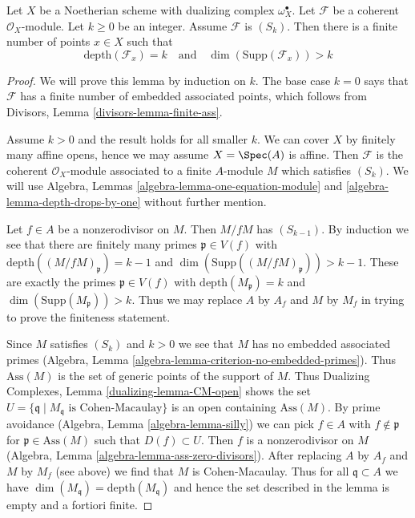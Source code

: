 \begin{lemma}
\label{lemma-finite-nr-points-next-S}
Let $X$ be a Noetherian scheme with dualizing complex $\omega_X^\bullet$.
Let $\mathcal{F}$ be a coherent $\mathcal{O}_X$-module. Let $k \geq 0$
be an integer. Assume $\mathcal{F}$ is $(S_k)$.
Then there is a finite number of points $x \in X$ such that
$$
\text{depth}(\mathcal{F}_x) = k
\quad\text{and}\quad
\dim(\text{Supp}(\mathcal{F}_x)) > k
$$
\end{lemma}

\begin{proof}
We will prove this lemma by induction on $k$. The base case $k = 0$
says that $\mathcal{F}$ has a finite number of embedded associated points,
which follows from Divisors, Lemma \ref{divisors-lemma-finite-ass}.

\medskip\noindent
Assume $k > 0$ and the result holds for all smaller $k$.
We can cover $X$ by finitely many affine opens, hence we may
assume $X = \Spec(A)$ is affine. Then $\mathcal{F}$ is the
coherent $\mathcal{O}_X$-module associated to a finite $A$-module $M$
which satisfies $(S_k)$. We will use
Algebra, Lemmas \ref{algebra-lemma-one-equation-module} and
\ref{algebra-lemma-depth-drops-by-one}
without further mention.

\medskip\noindent
Let $f \in A$ be a nonzerodivisor on $M$. Then $M/fM$ has $(S_{k - 1})$.
By induction we see that there are finitely many
primes $\mathfrak p \in V(f)$ with
$\text{depth}((M/fM)_\mathfrak p) = k - 1$ and
$\dim(\text{Supp}((M/fM)_\mathfrak p)) > k - 1$.
These are exactly the primes $\mathfrak p \in V(f)$ with
$\text{depth}(M_\mathfrak p) = k$ and
$\dim(\text{Supp}(M_\mathfrak p)) > k$.
Thus we may replace $A$ by $A_f$ and $M$ by $M_f$
in trying to prove the finiteness statement.

\medskip\noindent
Since $M$ satisfies $(S_k)$ and $k > 0$ we see that $M$ has no
embedded associated primes
(Algebra, Lemma \ref{algebra-lemma-criterion-no-embedded-primes}).
Thus $\text{Ass}(M)$ is the set of generic points of the support
of $M$. Thus Dualizing Complexes, Lemma \ref{dualizing-lemma-CM-open}
shows the set
$U = \{\mathfrak q \mid M_\mathfrak q\text{ is Cohen-Macaulay}\}$
is an open containing $\text{Ass}(M)$.
By prime avoidance (Algebra, Lemma \ref{algebra-lemma-silly})
we can pick $f \in A$ with
$f \not \in \mathfrak p$ for $\mathfrak p \in \text{Ass}(M)$
such that $D(f) \subset U$.
Then $f$ is a nonzerodivisor on $M$
(Algebra, Lemma \ref{algebra-lemma-ass-zero-divisors}).
After replacing $A$ by $A_f$ and $M$ by $M_f$ (see above) we
find that $M$ is Cohen-Macaulay.
Thus for all $\mathfrak q \subset A$ we have
$\dim(M_\mathfrak q) = \text{depth}(M_\mathfrak q)$
and hence the set described in the lemma is empty
and a fortiori finite.
\end{proof}